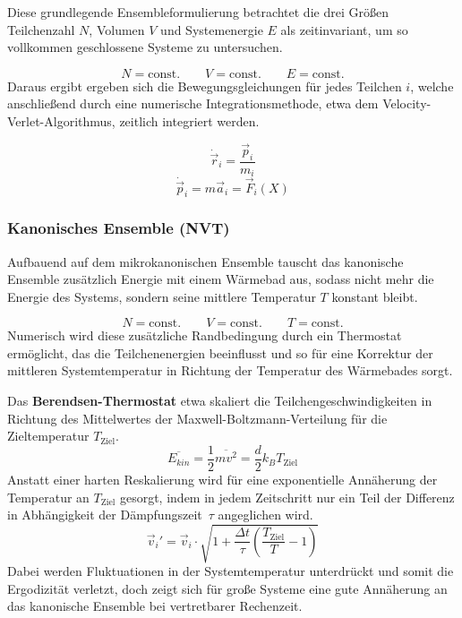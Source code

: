 Diese grundlegende Ensembleformulierung betrachtet die drei Größen Teilchenzahl $N$, Volumen $V$ und Systemenergie $E$ als zeitinvariant, um so vollkommen geschlossene Systeme zu untersuchen.

\begin{equation}
  N = \text{const.}
  \qquad
  V = \text{const.}
  \qquad
  E = \text{const.}
\end{equation}
Daraus ergibt ergeben sich die Bewegungsgleichungen für jedes Teilchen $i$, welche anschließend durch eine numerische Integrationsmethode, etwa dem Velocity-Verlet-Algorithmus, zeitlich integriert werden.

\begin{equation}
  \dot{\vec{r}}_i = \frac{\vec p_i}{m_i}
\end{equation}
\begin{equation}
  \dot{\vec{p}}_i = m \vec a_i = \vec F_i(X)
\end{equation}

\subsubsection{Kanonisches Ensemble (NVT)}

Aufbauend auf dem mikrokanonischen Ensemble tauscht das kanonische Ensemble zusätzlich Energie mit einem Wärmebad aus, sodass nicht mehr die Energie des Systems, sondern seine mittlere Temperatur $T$ konstant bleibt.

\begin{equation}
  N = \text{const.}
  \qquad
  V = \text{const.}
  \qquad
  T = \text{const.}
\end{equation}
Numerisch wird diese zusätzliche Randbedingung durch ein Thermostat ermöglicht, das die Teilchenenergien beeinflusst und so für eine Korrektur der mittleren Systemtemperatur in Richtung der Temperatur des Wärmebades sorgt.

Das \textbf{Berendsen-Thermostat}\cite{berendsen_molecular_1984} etwa skaliert die Teilchengeschwindigkeiten in Richtung des Mittelwertes der Maxwell-Boltzmann-Verteilung für die Zieltemperatur $T_\text{Ziel}$.
\begin{equation}
  \overline{E_{kin}} = \frac{1}{2} \overline{m v^2} = \frac{d}{2} k_B T_\text{Ziel}
\end{equation}
Anstatt einer harten Reskalierung wird für eine exponentielle Annäherung der Temperatur an $T_\text{Ziel}$ gesorgt, indem in jedem Zeitschritt nur ein Teil der Differenz in Abhängigkeit der Dämpfungszeit~$\tau$ angeglichen wird.
\begin{equation}
  \vec v_i' = \vec v_i \cdot \sqrt{1 + \frac{\Delta t}{\tau} \left(\frac{T_\text{Ziel}}{T} - 1\right)}
\end{equation}
Dabei werden Fluktuationen in der Systemtemperatur unterdrückt und somit die Ergodizität verletzt, doch zeigt sich für große Systeme eine gute Annäherung an das kanonische Ensemble bei vertretbarer Rechenzeit.


